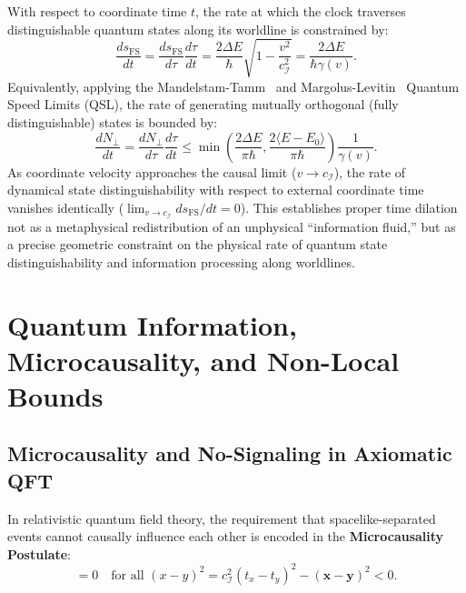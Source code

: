 \documentclass[11pt,a4paper]{article}
\begin{document}
With respect to coordinate time $t$, the rate at which the clock traverses distinguishable quantum states along its worldline is constrained by:
\begin{equation}
\frac{ds_{\text{FS}}}{dt} = \frac{ds_{\text{FS}}}{d\tau} \frac{d\tau}{dt} = \frac{2\Delta E}{\hbar} \sqrt{1 - \frac{v^2}{c_{\mathcal{I}}^2}} = \frac{2\Delta E}{\hbar \gamma(v)}.
\end{equation}
Equivalently, applying the Mandelstam-Tamm~\cite{mandelstam1945} and Margolus-Levitin~\cite{margolus1998} Quantum Speed Limits (QSL), the rate of generating mutually orthogonal (fully distinguishable) states is bounded by:
\begin{equation}
\frac{d N_\perp}{dt} = \frac{d N_\perp}{d\tau} \frac{d\tau}{dt} \le \min\left( \frac{2\Delta E}{\pi\hbar}, \frac{2\langle E - E_0\rangle}{\pi\hbar} \right) \frac{1}{\gamma(v)}.
\end{equation}
As coordinate velocity approaches the causal limit ($v \to c_{\mathcal{I}}$), the rate of dynamical state distinguishability with respect to external coordinate time vanishes identically ($\lim_{v \to c_{\mathcal{I}}} ds_{\text{FS}}/dt = 0$). This establishes proper time dilation not as a metaphysical redistribution of an unphysical ``information fluid,'' but as a precise geometric constraint on the physical rate of quantum state distinguishability and information processing along worldlines.

\section{Quantum Information, Microcausality, and Non-Local Bounds}

\subsection{Microcausality and No-Signaling in Axiomatic QFT}

In relativistic quantum field theory, the requirement that spacelike-separated events cannot causally influence each other is encoded in the \textbf{Microcausality Postulate}:
\begin{equation}
[\hat{\mathcal{O}}_A(x), \hat{\mathcal{O}}_B(y)] = 0 \quad \text{for all } (x - y)^2 = c_{\mathcal{I}}^2 (t_x - t_y)^2 - (\mathbf{x} - \mathbf{y})^2 < 0.
\end{equation}
\end{document}
